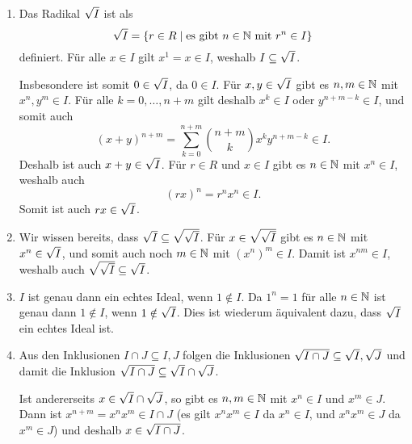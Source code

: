 \begin{solution}
  \begin{enumerate}
    \item
      Das Radikal $\sqrt{I}$ ist als
      \[
          \sqrt{I}
        = \{ r \in R \mid \text{es gibt $n \in \mathbb{N}$ mit $r^n \in I$} \}
      \]
      definiert.
      Für alle $x \in I$ gilt $x^1 = x \in I$, weshalb $I \subseteq \sqrt{I}$.
      
      Insbesondere ist somit $0 \in \sqrt{I}$, da $0 \in I$.
      Für $x, y \in \sqrt{I}$ gibt es $n, m \in \mathbb{N}$ mit $x^n, y^m \in I$.
      Für alle $k = 0, \dotsc, n+m$ gilt deshalb $x^k \in I$ oder $y^{n+m-k} \in I$, und somit auch
      \[
          (x + y)^{n+m}
        = \sum_{k=0}^{n+m} \binom{n+m}{k} x^k y^{n+m-k} \in I.
      \]
      Deshalb ist auch $x + y \in \sqrt{I}$.
      Für $r \in R$ und $x \in I$ gibt es $n \in \mathbb{N}$ mit $x^n \in I$, weshalb auch
      \[
        (r x)^n = r^n x^n \in I.
      \]
      Somit ist auch $r x \in \sqrt{I}$.
      
    \item
      Wir wissen bereits, dass $\sqrt{I} \subseteq \sqrt{\sqrt{I}}$.
      Für $x \in \sqrt{\sqrt{I}}$ gibt es $n \in \mathbb{N}$ mit $x^n \in \sqrt{I}$, und somit auch noch $m \in \mathbb{N}$ mit $(x^n)^m \in I$.
      Damit ist $x^{nm} \in I$, weshalb auch $\sqrt{\sqrt{I}} \subseteq \sqrt{I}$.
    
    \item
      $I$ ist genau dann ein echtes Ideal, wenn $1 \notin I$.
      Da $1^n = 1$ für alle $n \in \mathbb{N}$ ist genau dann $1 \notin I$, wenn $1 \notin \sqrt{I}$.
      Dies ist wiederum äquivalent dazu, dass $\sqrt{I}$ ein echtes Ideal ist.
    
    \item
      Aus den Inklusionen $I \cap J \subseteq I, J$ folgen die Inklusionen $\sqrt{I \cap J} \subseteq \sqrt{I}, \sqrt{J}$ und damit die Inklusion $\sqrt{I \cap J} \subseteq \sqrt{I} \cap \sqrt{J}$.
      
      Ist andererseits $x \in \sqrt{I} \cap \sqrt{J}$, so gibt es $n, m \in \mathbb{N}$ mit $x^n \in I$ und $x^m \in J$.
      Dann ist $x^{n+m} = x^n x^m \in I \cap J$ (es gilt $x^n x^m \in I$ da $x^n \in I$, und $x^n x^m \in J$ da $x^m \in J$) und deshalb $x \in \sqrt{I \cap J}$.
    

\end{enumerate}
\end{solution}
